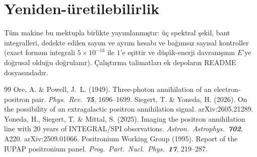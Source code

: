\documentclass[11pt,a4paper]{article}
\begin{document}
\section{Yeniden-üretilebilirlik}
Tüm makine bu mektupla birlikte yayımlanmıştır: üç spektral şekil, bant
integralleri, dedekte edilen sayım ve ayrım hesabı ve bağımsız sayısal
kontroller (exact formun integrali $5\times10^{-13}$ ile $1$'e eşittir ve
düşük-enerji davranışının $E$'ye doğrusal olduğu doğrulanır).
Çalıştırma talimatları ek depoların README dosyasındadır.

\begin{thebibliography}{99}
     Ore, A. \& Powell, J.~L. (1949). Three-photon
    annihilation of an electron-positron pair. \textit{Phys.\ Rev.\ \textbf{75}},
    1696--1699.
     Siegert, T. \& Yoneda, H. (2026). On the possibility of
    an extragalactic positron annihilation signal.
    arXiv:2605.21289.
     Yoneda, H., Siegert, T. \& Mittal, S. (2025).
    Imaging the positron annihilation line with 20 years of
    INTEGRAL/SPI observations. \textit{Astron.\ Astrophys.\ \textbf{702}},
    A220. arXiv:2509.01066.
     Positronium Working Group (1995). Report of the
    IUPAP positronium panel. \textit{Prog.\ Part.\ Nucl.\ Phys.\ \textbf{17}},
    219--287.
\end{thebibliography}
\end{document}
